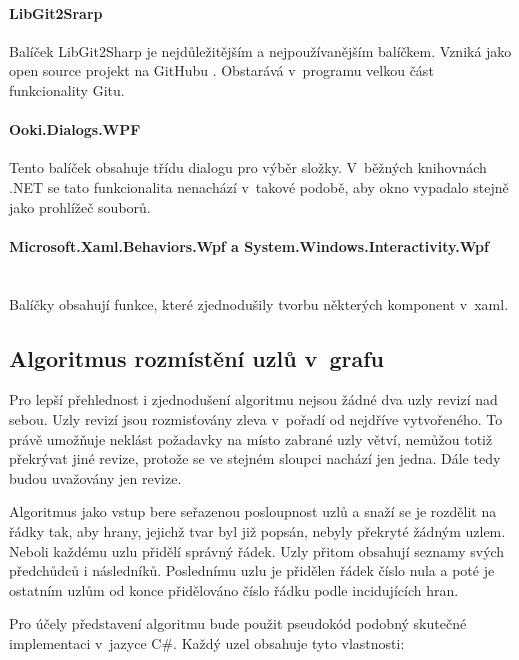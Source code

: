 \documentclass[
  biblatex,
  glossaries,
  index
]{kidiplom}
\begin{document}
\paragraph*{LibGit2Srarp}
Balíček LibGit2Sharp je nejdůležitějším a nejpoužívanějším balíčkem. Vzniká jako open source projekt na GitHubu \citep{libgitreference}. Obstarává v~programu velkou část funkcionality Gitu.

\paragraph*{Ooki.Dialogs.WPF}
Tento balíček obsahuje třídu dialogu pro výběr složky. V~běžných knihovnách .NET se tato funkcionalita nenachází v~takové podobě, aby okno vypadalo stejně jako prohlížeč souborů.

\paragraph*{Microsoft.Xaml.Behaviors.Wpf a System.Windows.Interactivity.Wpf}\hfil\\
Balíčky obsahují funkce, které zjednodušily tvorbu některých komponent v~xaml.



\subsection{Algoritmus rozmístění uzlů v~grafu}
\label{subsec:algorithm}
Pro lepší přehlednost i zjednodušení algoritmu nejsou žádné dva uzly revizí nad sebou. Uzly revizí jsou rozmisťovány zleva v~pořadí od nejdříve vytvořeného. To právě umožňuje neklást požadavky na místo zabrané uzly větví, nemůžou totiž překrývat jiné revize, protože se ve stejném sloupci nachází jen jedna. Dále tedy budou uvažovány jen revize.

Algoritmus jako vstup bere seřazenou posloupnost uzlů a snaží se je rozdělit na řádky tak, aby hrany, jejichž tvar byl již popsán, nebyly překryté žádným uzlem. Neboli každému uzlu přidělí správný řádek. Uzly přitom obsahují seznamy svých předchůdců i následníků. Poslednímu uzlu je přidělen řádek číslo nula a poté je ostatním uzlům od konce přidělováno číslo řádku podle incidujících hran.

Pro účely představení algoritmu bude použit pseudokód podobný skutečné implementaci v~jazyce C\#. Každý uzel obsahuje tyto vlastnosti:
\end{document}
